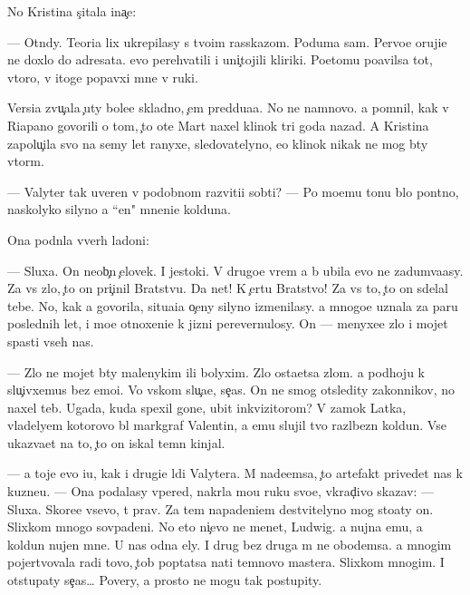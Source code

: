 \documentclass[10pt]{book}
\begin{document}
No Kristina s{\c}itala ina{\c}e:

— Otn{\iu}dy. Teori{\y}a lix ukrepilasy s tvo{\y}im rasskazom. Poduma{\y} sam. Pervo{\y}e oruji{\y}e ne doxlo do adresata. {\Y}evo perehvatili i uni{\c}tojili kliriki. Poetomu po{\y}avilsa tot, vtoro{\y}, v itoge popavxi{\y} mne v ruki.

Versi{\y}a zvu{\c}ala {\c}uty bole{\y}e skladno, {\c}em pred{\yi}du{\x}a{\y}a. No ne namnovo. {\Y}a pomnil, kak v Riapano govorili o tom, {\c}to ote{\q} Mart naxel klinok tri goda nazad. A Kristina zapolu{\c}ila svo{\y} na semy let ranyxe, sledovatelyno, {\y}e{\y}o klinok nikak ne mog b{\yi}ty vtor{\yi}m.

— Valyter tak uveren v podobnom razviti{\y}i sob{\yi}ti{\y}? — Po mo{\y}emu tonu b{\yi}lo pon{\ia}tno, naskolyko silyno {\y}a ``{\q}en{\iu}" mneni{\y}e kolduna.

Ona podn{\ia}la vverh ladoni:

— Sluxa{\y}. On neob{\yi}{\c}n{\yi}{\y} {\c}elovek. I jestoki{\y}. V drugo{\y}e vrem{\ia} {\y}a b{\yi} ubila {\y}evo ne zadum{\yi}va{\y}asy. Za vs{\e} zlo, {\c}to on pri{\c}inil Bratstvu. Da net! K {\c}ertu Bratstvo! Za vs{\e} to, {\c}to on sdelal tebe. No, kak {\y}a govorila, situa{\q}i{\y}a o{\c}eny silyno izmenilasy. {\Y}a mnogo{\y}e uznala za paru poslednih let, i mo{\y}e otnoxeni{\y}e k jizni perevernulosy. On — menyxe{\y}e zlo i mojet spasti vseh nas.

— Zlo ne mojet b{\yi}ty malenykim ili bolyxim. Zlo osta{\y}etsa zlom. {\Y}a podhoju k slu{\c}ivxemus{\ia} bez emo{\q}i{\y}. Vo vs{\ia}kom slu{\c}a{\y}e, se{\y}{\c}as. On ne smog otsledity zakonnikov, no naxel teb{\ia}. Ugada{\y}, kuda spexil gone{\q}, ubit{\yi}{\y} inkvizitorom? V zamok Latka, vladely{\q}em kotorovo b{\yi}l markgraf Valentin, a {\y}emu slujil tvo{\y} razl{\iu}bezn{\yi}{\y} koldun. Vse ukaz{\yi}va{\y}et na to, {\c}to on iskal temn{\yi}{\y} kinjal.

— {\Y}a toje {\y}evo i{\x}u, kak i drugi{\y}e l{\iu}di Valytera. M{\yi} nade{\y}emsa, {\c}to artefakt privedet nas k kuzne{\q}u. — Ona podalasy vpered, nakr{\yi}la mo{\y}u ruku svo{\y}e{\y}, vkrad{\c}ivo skazav: — Sluxa{\y}. Skore{\y}e vsevo, t{\yi} prav. Za tem napadeni{\y}em de{\y}stvitelyno mog sto{\y}aty on. Slixkom mnogo sovpadeni{\y}. No eto ni{\c}evo ne men{\ia}{\y}et, Ludwig. {\Y}a nujna {\y}emu, a koldun nujen mne. U nas odna {\q}ely. I drug bez druga m{\yi} ne obo{\y}demsa. {\Y}a mnogim pojertvovala radi tovo, {\c}tob{\yi} pop{\yi}tatsa na{\y}ti temnovo mastera. Slixkom mnogim. I otstupaty se{\y}{\c}as… Povery, {\y}a prosto ne mogu tak postupity.
\end{document}
